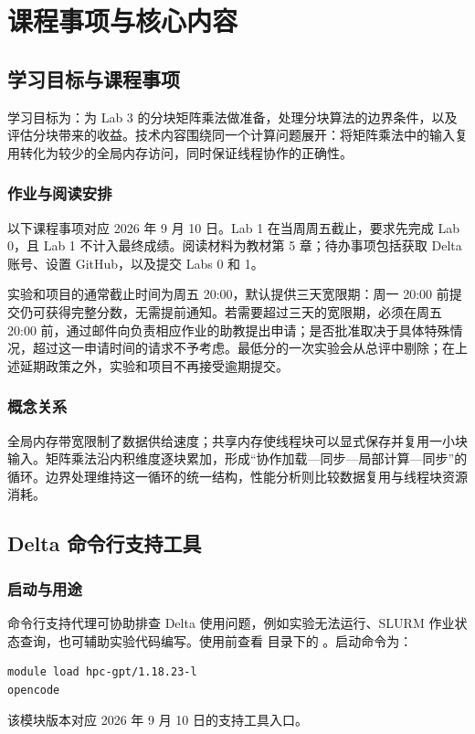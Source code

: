 \section{课程事项与核心内容}

\subsection{学习目标与课程事项}
学习目标为：为 Lab 3 的分块矩阵乘法做准备，处理分块算法的边界条件，以及评估分块带来的收益。技术内容围绕同一个计算问题展开：将矩阵乘法中的输入复用转化为较少的全局内存访问，同时保证线程协作的正确性。

\subsubsection{作业与阅读安排}
以下课程事项对应 2026 年 9 月 10 日。Lab 1 在当周周五截止，要求先完成 Lab 0，且 Lab 1 不计入最终成绩。阅读材料为教材第 5 章；待办事项包括获取 Delta 账号、设置 GitHub，以及提交 Labs 0 和 1。

实验和项目的通常截止时间为周五 20:00，默认提供三天宽限期：周一 20:00 前提交仍可获得完整分数，无需提前通知。若需要超过三天的宽限期，必须在周五 20:00 前，通过邮件向负责相应作业的助教提出申请；是否批准取决于具体特殊情况，超过这一申请时间的请求不予考虑。最低分的一次实验会从总评中剔除；在上述延期政策之外，实验和项目不再接受逾期提交。

\subsubsection{概念关系}
全局内存带宽限制了数据供给速度；共享内存使线程块可以显式保存并复用一小块输入。矩阵乘法沿内积维度逐块累加，形成“协作加载—同步—局部计算—同步”的循环。边界处理维持这一循环的统一结构，性能分析则比较数据复用与线程块资源消耗。

\subsection{Delta 命令行支持工具}
\subsubsection{启动与用途}
\par\noindent\begin{minipage}{\linewidth}
命令行支持代理可协助排查 Delta 使用问题，例如实验无法运行、SLURM 作业状态查询，也可辅助实验代码编写。使用前查看  目录下的 。启动命令为：

\begin{lstlisting}[language=bash,numbers=none]
module load hpc-gpt/1.18.23-l
opencode
\end{lstlisting}
\end{minipage}\par
该模块版本对应 2026 年 9 月 10 日的支持工具入口。

